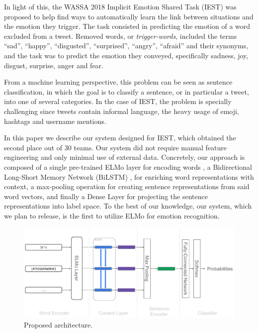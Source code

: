 \documentclass[11pt,a4paper]{article}
\newcommand{\Acronym}[1]{\mbox{#1}}
\begin{document}
In light of this, the \Acronym{WASSA} 2018 Implicit Emotion Shared Task
(\Acronym{IEST}) \cite{klinger2018iest} was proposed to help find ways to
automatically learn the link between situations and the emotion they trigger.
The task consisted in predicting the emotion of a word excluded from a tweet.
Removed words, or \textit{trigger-words}, included the terms ``sad'', ``happy'',
``disgusted'', ``surprised'', ``angry'', ``afraid'' and their synonyms, and the
task was to predict the emotion they conveyed, specifically sadness, joy,
disgust, surprise, anger and fear.

From a machine learning perspective, this problem can be seen as sentence
classification, in which the goal is to classify a sentence, or in particular a
tweet, into one of several categories. In the case of \Acronym{IEST}, the
problem is specially challenging since tweets contain informal language, the
heavy usage of emoji, hashtags and username mentions.

In this paper we describe our system designed for \Acronym{IEST}, which obtained
the second place out of 30 teams. Our system did not require manual feature
engineering and only minimal use of external data. Concretely, our approach is
composed of a single pre-trained \Acronym{ELMo} layer for encoding words
\cite{peters2018deep}, a Bidirectional Long-Short Memory Network
(\Acronym{BiLSTM}) \cite{graves2005framewise, graves2013speech}, for enriching
word representations with context, a max-pooling operation for creating sentence
representations from said word vectors, and finally a Dense Layer for projecting
the sentence representations into label space. To the best of our knowledge, our
system, which we plan to release, is the first to utilize ELMo for emotion
recognition. 




\begin{figure}
    \centering
    \includegraphics[scale=0.6]{images/iest_architecture.pdf}
    \caption{Proposed architecture.}
    \label{fig:architecture}
\end{figure}
\end{document}

